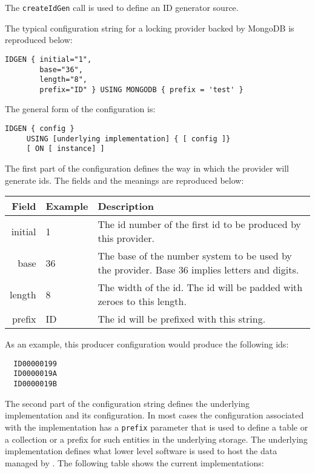 The \verb+createIdGen+ call is used to define an ID generator source.

The typical configuration string for a locking provider backed by MongoDB is reproduced below:

\begin{Verbatim}
IDGEN { initial="1",
        base="36",
        length="8",
        prefix="ID" } USING MONGODB { prefix = 'test' }
\end{Verbatim}

The general form of the configuration is:

\begin{Verbatim}
IDGEN { config }
     USING [underlying implementation] { [ config ]}
     [ ON [ instance] ]
\end{Verbatim}

The first part of the configuration defines the way in which the provider will generate ids. The fields
and the meanings are reproduced below:

\begin{table}[H]
  \small
\begin{center}
\begin{tabular}{r l p{8cm}}
  Field & Example & Description \\
  \hline
  initial & 1 & The id number of the first id to be produced by this provider. \\
  base & 36 & The base of the number system to be used by the provider. Base 36 implies letters and digits. \\
  length & 8 & The width of the id. The id will be padded with zeroes to this length. \\
  prefix & ID & The id will be prefixed with this string. \\
\end{tabular}
\end{center}
\end{table}

As an example, this producer configuration would produce the following ids:

\begin{Verbatim}
  ID00000199
  ID0000019A
  ID0000019B
\end{Verbatim}

The second part of the configuration string defines the underlying implementation and its configuration. In
most cases the configuration associated with the implementation has a \verb+prefix+ parameter that is used to
define a table or a collection or a prefix for such entities in the underlying storage. The underlying implementation
defines what lower level software is used to host the data managed by \Rapture. The following table shows the current
implementations:

